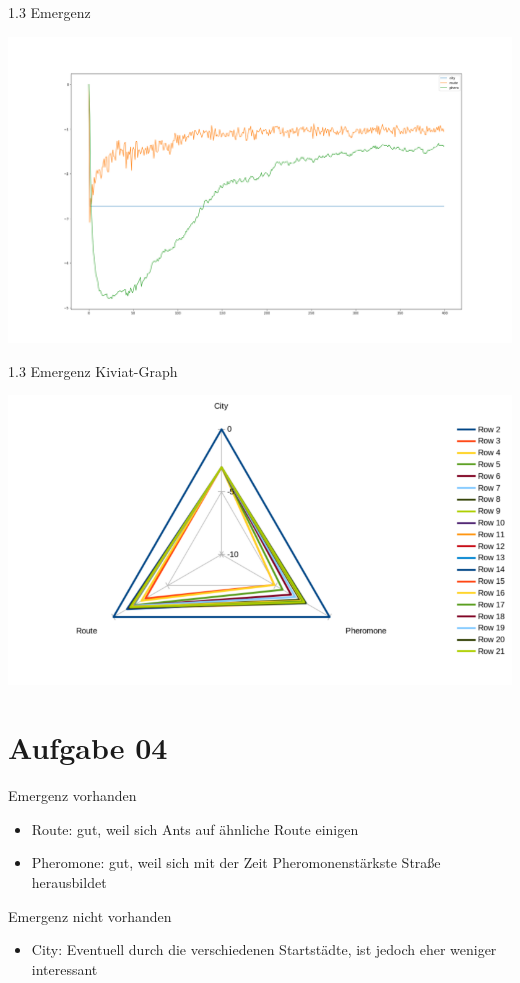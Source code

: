 \documentclass{ocbeameruni}
\begin{document}
\begin{frame}{1.3 Emergenz}
    \begin{center}
    \includegraphics[scale=0.2]{Emerg_per_iter.png}
    \end{center}
\end{frame}

\begin{frame}{1.3 Emergenz Kiviat-Graph}
    \begin{center}
    \includegraphics[scale=0.4]{emerg_spider.png}
    \end{center}
\end{frame}

\section{Aufgabe 04}

\begin{frame}{Emergenz vorhanden}
    \begin{itemize}
    \item Route: gut, weil sich Ants auf ähnliche Route einigen
    \item Pheromone: gut, weil sich mit der Zeit Pheromonenstärkste Straße herausbildet
    \end{itemize}
\end{frame}

\begin{frame}{Emergenz nicht vorhanden}
    \begin{itemize}
    \item City: Eventuell durch die verschiedenen Startstädte, ist jedoch eher weniger interessant
    \end{itemize}
\end{frame}
\end{document}
